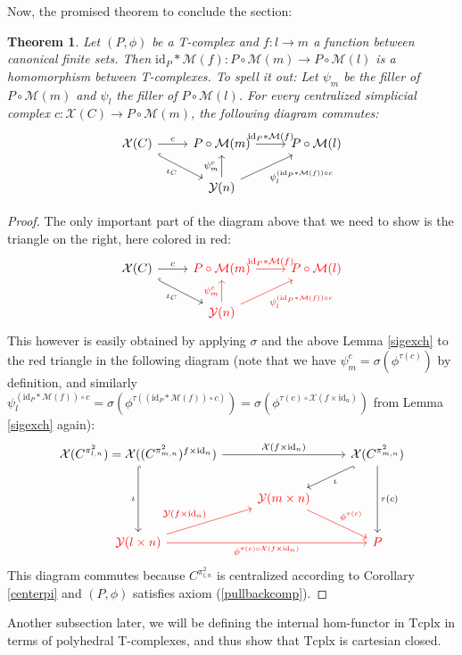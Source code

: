 \documentclass{article}
\newtheorem{theorem}{Theorem}[subsection]
\theoremstyle{remark}
\theoremstyle{definition}
\newcommand{\id}{\mathrm{id}}
\newcommand{\Y}{\mathcal Y}
\newcommand{\X}{\mathcal X}
\newcommand{\Tcplx}{\mathrm{Tcplx}}
\newcommand{\M}{\mathcal M}
\begin{document}
	Now, the promised theorem to conclude the section:
	\begin{theorem}
		Let $(P,\phi)$ be a T-complex and $f:l\to m$ a function between canonical finite sets. Then $\id_P*\M(f):P\circ\M(m)\to P\circ\M(l)$ is a homomorphism between T-complexes. To spell it out: Let $\psi_m$ be the filler of $P\circ\M(m)$ and $\psi_l$ the filler of $P\circ\M(l)$. For every centralized simplicial complex $c:\X(C)\to P\circ\M(m)$, the following diagram commutes:
		\[\begin{tikzcd}
			\X(C)\arrow[hook]{dr}[swap]{\iota_C}\arrow{r}{c}&P\circ\M(m)\arrow{r}{\id_P*\M(f)}&P\circ\M(l)\\
			&\Y(n)\arrow{u}{\psi_m^c}\arrow{ur}[swap]{\psi_l^{(\id_P*\M(f))\circ c}}
		\end{tikzcd}\]
	\end{theorem}
	\begin{proof}
		The only important part of the diagram above that we need to show is the triangle on the right, here colored in red:
		\[\begin{tikzcd}
			\X(C)\arrow[hook]{dr}[swap]{\iota_C}\arrow{r}{c}&\color{red}{P\circ\M(m)}\arrow[color=red]{r}{\id_P*\M(f)}&\color{red}{P\circ\M(l)}\\
			&\color{red}{\Y(n)}\arrow[color=red]{u}{\psi_m^c}\arrow[color=red]{ur}[swap]{\psi_l^{(\id_P*\M(f))\circ c}}
		\end{tikzcd}\]
		This however is easily obtained by applying $\sigma$ and the above Lemma \ref{sigexch} to the red triangle in the following diagram (note that we have $\psi_m^c=\sigma(\phi^{\tau(c)})$ by definition, and similarly $\psi_l^{(\id_P*\M(f))\circ c}=\sigma(\phi^{\tau((\id_P*\M(f))\circ c)})=\sigma(\phi^{\tau(c)\circ\X(f\times\id_n)})$ from Lemma \ref{sigexch} again):
		\[\begin{tikzcd}
			\X(C^{\pi^2_{l,n}})=\X((C^{\pi^2_{m,n}})^{f\times\id_n})
			\arrow[hook]{dd}[swap]{\iota}
			\arrow{rr}{\X(f\times\id_n)}
			&&
			\X(C^{\pi^2_{m,n}})
			\arrow[hook]{ld}{\iota}
			\arrow{dd}{\tau(c)}
			\\&
			\color{red}{\Y(m\times n)}
			\arrow[color=red]{dr}{\phi^{\tau(c)}}
			\\
			\color{red}{\Y(l\times n)}
			\arrow[color=red]{ur}{\Y(f\times\id_n)}
			\arrow[color=red]{rr}[swap]{\phi^{\tau(c)\circ\X(f\times\id_n)}}
			&&
			\color{red}P
		\end{tikzcd}\]
		This diagram commutes because $C^{\pi^2_{l,n}}$ is centralized according to Corollary \ref{centerpi} and $(P,\phi)$ satisfies axiom (\ref{pullbackcomp}).
	\end{proof}
	Another subsection later, we will be defining the internal hom-functor in $\Tcplx$ in terms of polyhedral T-complexes, and thus show that $\Tcplx$ is cartesian closed.
\end{document}
